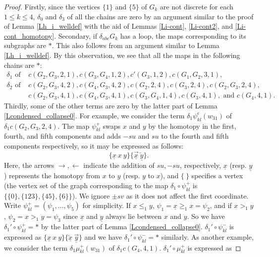 \documentclass[reqno]{amsart}
\theoremstyle{definition}
\theoremstyle{plain}
\newcommand{\eps}{\epsilon}
\begin{document}
\begin{proof}
 Firstly, since the vertices $\{1\}$ and $\{5\}$ of $G_k$ are not discrete for each $1\leq k\leq 4$, $\delta_0$ and $\delta_3$ of all the chains are zero by an argument similar to  the proof of Lemma \ref{Lh_i_welldef} with the aid of   Lemmas \ref{Li-cont},  \ref{Li-cont2}, and \ref{Li-cont_homotopy}.  Secondary, if $\delta_{abc}G_k$ has a loop, the maps corresponding to its subgraphs are $*$. This also follows from an argument similar to Lemma \ref{Lh_i_welldef}. By this observation, we see that all the maps in the following chains are $*$:
\[
\begin{split}
\delta_1 \text{ of }& c(G_2,G_3,2,1), c(G_3,G_4,1,2), c'(G_3,1,2), c(G_1,G_2,3,1),\\
\delta_2 \text{ of }& c(G_2,G_3,4,2), c(G_4,G_3,4,2), c(G_2,2,4), c(G_3,2,4), c(G_2,G_3,2,4),\\ &c(G_2,G_3,4,1), c(G_4,G_3,4,1), c(G_3,G_4,1,4), c(G_3,4,1), \text{ and } c(G_4,4,1). 
\end{split}
\]Thirdly, some of the other terms are zero by the latter part of Lemma \ref{Lcondensed_collapse0}. For example, we consider the term $\delta_1\psi^\eps_{kl}(w_{31})$ of  $\delta_1c(G_2,G_3,2,4)$. The map $\psi^+_{kl}$ swaps $x$ and $y$ by the homotopy in the first, fourth, and fifth components and adds $-su$ and $su$ to the fourth and fifth components respectively, so it may be expressed as follows:
\[
\{\underline{x}\   x\ y\}\{\overrightarrow{\underline{x}}\  \overleftarrow{\underline{y}}\}.
\]
Here, the arrows $\rightarrow, \leftarrow$ indicate the addition of $su, -su$, respectively,  $\underline{x}$ (resp. $\underline{y}$) represents the homotopy from $x$ to $y$ (resp. $y$ to $x$), and $\{\ \}$ specifies a vertex (the vertex set of the graph corresponding to the map $\delta_1\circ \psi^+_{kl}$  is $\{\{0\},\{123\},\{45\},\{6\}\}$). We ignore $\pm sv$ as it does not affect the first coordinate. Write $\psi^+_{kl}=(\psi_1,\dots,\psi_5)$ for simplicity. If $x\leq_1y$, $\psi_1=\underline{x}\geq_1x=\psi_2$, and if $x>_1y$, $\psi_2=x>_1y=\psi_3$ since $\underline{x}$ and $\underline{y}$ always lie between $x$ and $y$. So we have $\delta_1'\circ \psi^+_{kl}=*$ by the latter part of Lemma \ref{Lcondensed_collapse0}. $\delta_1'\circ \psi^-_{kl}$ is expressed as $\{\underline{x}\   x\ y\}\{\overleftarrow{\underline{x}}\  \overrightarrow{\underline{y}}\}$ and we have $\delta_1'\circ\psi^-_{kl}=*$ similarly. As another example, we consider the term $\delta_1\mu^+_{kl}(w_{31})$ of $\delta_1c(G_4,4,1)$. $\delta_1'\circ \mu^+_{kl}$ is expressed as 

\end{proof}
\end{document}
